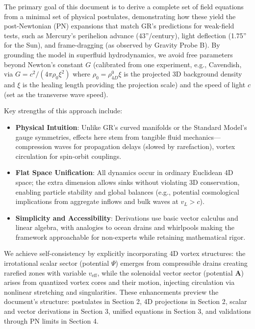 \documentclass{article}
\begin{document}
The primary goal of this document is to derive a complete set of field equations from a minimal set of physical postulates, demonstrating how these yield the post-Newtonian (PN) expansions that match GR's predictions for weak-field tests, such as Mercury's perihelion advance (43''/century), light deflection (1.75'' for the Sun), and frame-dragging (as observed by Gravity Probe B). By grounding the model in superfluid hydrodynamics, we avoid free parameters beyond Newton's constant $G$ (calibrated from one experiment, e.g., Cavendish, via $G = c^2 / (4\pi \rho_0 \xi^2)$ where $\rho_0 = \rho_{4D}^0 \xi$ is the projected 3D background density and $\xi$ is the healing length providing the projection scale) and the speed of light $c$ (set as the transverse wave speed).

Key strengths of this approach include:
\begin{itemize}
    \item \textbf{Physical Intuition}: Unlike GR's curved manifolds or the Standard Model's gauge symmetries, effects here stem from tangible fluid mechanics---compression waves for propagation delays (slowed by rarefaction), vortex circulation for spin-orbit couplings.
    \item \textbf{Flat Space Unification}: All dynamics occur in ordinary Euclidean 4D space; the extra dimension allows sinks without violating 3D conservation, enabling particle stability and global balances (e.g., potential cosmological implications from aggregate inflows and bulk waves at $v_L > c$).
    \item \textbf{Simplicity and Accessibility}: Derivations use basic vector calculus and linear algebra, with analogies to ocean drains and whirlpools making the framework approachable for non-experts while retaining mathematical rigor.
\end{itemize}

We achieve self-consistency by explicitly incorporating 4D vortex structures: the irrotational scalar sector (potential $\Psi$) emerges from compressible drains creating rarefied zones with variable $v_{\text{eff}}$, while the solenoidal vector sector (potential $\mathbf{A}$) arises from quantized vortex cores and their motion, injecting circulation via nonlinear stretching and singularities. These enhancements preview the document's structure: postulates in Section 2, 4D projections in Section 2, scalar and vector derivations in Section 3, unified equations in Section 3, and validations through PN limits in Section 4.
\end{document}
